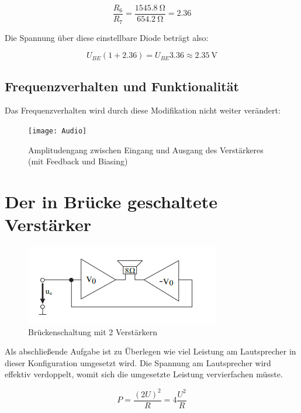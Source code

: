 \begin{equation}
    \frac{R_6}{R_7} = \frac{\SI{1545.8}{\ohm}}{\SI{654.2}{\ohm}} = 2.36
\end{equation}

Die Spannung über diese \lgqq einstellbare Diode\rgqq{} beträgt also:

\begin{equation}
    U_{BE} \left( 1 + 2.36 \right) = U_{BE} 3.36 \approx \SI{2.35}{\volt}
\end{equation}

\subsection{Frequenzverhalten und Funktionalität}

Das Frequenzverhalten wird durch diese Modifikation nicht weiter verändert:

\begin{figure}[H]
    \centering
    \texttt{[image: Audio]}
    \caption{Amplitudengang zwischen Eingang und Ausgang des Verstärkeres (mit Feedback und Biasing)}
    \label{fig:my_label}
\end{figure}

\section{Der in Brücke geschaltete Verstärker}

\begin{figure}[H]
    \centering
    \includegraphics{tex/7_Leistungsverstaerker/pictures/Bridgeamp.png}
    \caption{Brückenschaltung mit 2 Verstärkern}
    \label{fig:my_label}
\end{figure}

Als abschließende Aufgabe ist zu Überlegen wie viel Leistung am Lautsprecher in dieser Konfiguration umgesetzt wird. Die Spannung am Lautsprecher wird effektiv verdoppelt, womit sich die umgesetzte Leistung vervierfachen müsste. 

\begin{equation*}
    P = \frac{(2 U)^2}{R} = 4 \frac{U^2}{R}
\end{equation*}